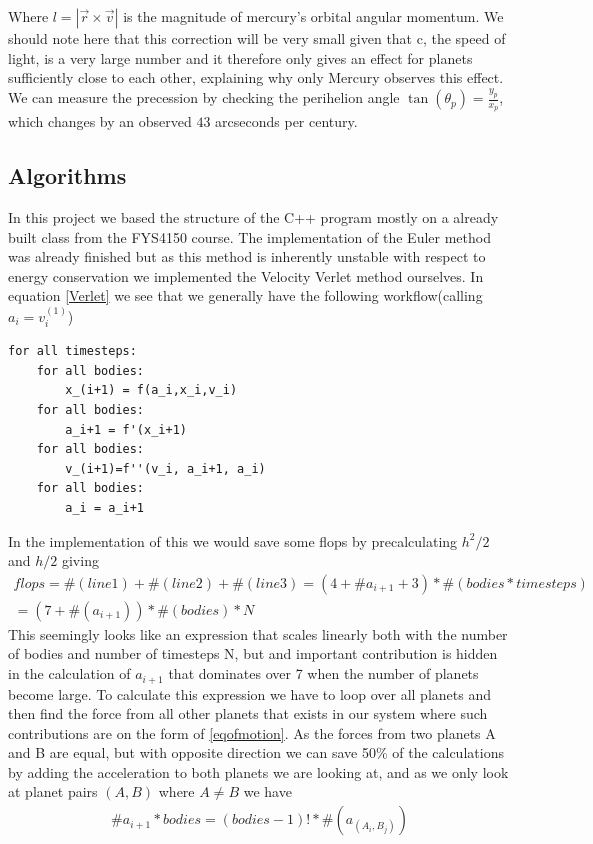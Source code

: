 \documentclass[a4paper,11pt]{article}
\begin{document}
{Where $l = |\vec{r}\times \vec{v}|$ is the magnitude of mercury's orbital angular momentum. We should note here that this correction will be very small given that c, the speed of light, is a very large number and it therefore only gives an effect for planets sufficiently close to each other, explaining why only Mercury observes this effect. We can measure the precession by checking the perihelion angle $\tan\left(\theta_p\right) = \frac{y_p}{x_p}$, which changes by an observed $43$ arcseconds per century.

\subsection*{Algorithms}
In this project we based the structure of the C++ program mostly on a already built class from the FYS4150 course. The implementation of the Euler method was already finished but as this method is inherently unstable with respect to energy conservation we implemented the Velocity Verlet method ourselves. In equation \ref{Verlet} we see that we generally have the following workflow(calling $a_i = v^{(1)}_i$)
\begin{lstlisting}
for all timesteps:
	for all bodies:
		x_(i+1) = f(a_i,x_i,v_i)
	for all bodies:
		a_i+1 = f'(x_i+1)
	for all bodies:
		v_(i+1)=f''(v_i, a_i+1, a_i)
	for all bodies:
		a_i = a_i+1
\end{lstlisting}
In the implementation of this we would save some flops by precalculating $h^2/2$ and $h/2$ giving
\begin{align}
	flops = \#(line1) +  \#(line2)+ \#(line3) = (4+ \# a_{i+1} + 3)*\#( bodies*timesteps) \\
	= (7 + \# (a_{i+1}))*\#( bodies)*N
\end{align}
This seemingly looks like an expression that scales linearly both with the number of bodies and number of timesteps N, but and important contribution is hidden in the calculation of $a_{i+1}$ that dominates over 7 when the number of planets become large.  To calculate this expression we have to loop over all planets and then find the force from all other planets that exists in our system where such contributions are on the form of \ref{eqofmotion}. As the forces from two planets A and B are equal, but with opposite direction we can save 50$\%$ of the calculations by adding the acceleration to both planets we are looking at, and as we only look at planet pairs $(A,B)$ where $A\neq B$ we have 
\begin{align}
	\# a_{i+1}*bodies = (bodies-1)! *\#(a_{(A_i,B_j)})

\end{align}}
\end{document}
